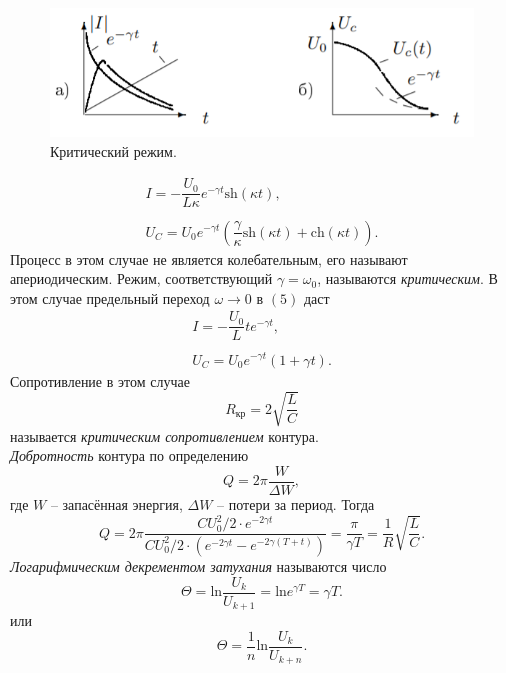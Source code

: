 \documentclass[a4paper,12pt]{report}
\begin{document}
\begin{figure}
\includegraphics[scale=0.7]{4.png}
\caption{Критический режим.}
\vspace{-40pt}
\end{figure}
$$
\begin{array}{c}
I = -\dfrac{U_0}{L\kappa}e^{-\gamma t}\text{sh}(\kappa t),\\
\\
U_C = U_0 e^{-\gamma t}\left( \dfrac{\gamma}{\kappa}\text{sh}(\kappa t) + \text{ch}(\kappa t) \right).
\end{array}
$$
Процесс в этом случае не является колебательным, его называют апериодическим. Режим, соответствующий $\gamma = \omega_0$, называются \textit{критическим}. В этом случае предельный переход $\omega \rightarrow 0$ в $(5)$ даст 
$$
\begin{array}{c}
I = -\dfrac{U_0}{L}te^{-\gamma t},\\
\\
U_C=U_0 e^{-\gamma t}(1+\gamma t).
\end{array}
$$
Сопротивление в этом случае 
\begin{equation}
R_{\text{кр}}= 2 \sqrt{\dfrac{L}{C}}
\end{equation}
называется \textit{критическим сопротивлением} контура.\\
\textit{Добротность} контура по определению 
$$
Q = 2\pi \dfrac{W}{\Delta W},
$$ 
где $W$ -- запасённая энергия, $\Delta W$ -- потери за период. Тогда
\begin{equation}
Q = 2\pi\dfrac{CU_0^2/2 \cdot e^{-2\gamma t}}{CU_0^2/2 \cdot (e^{-2\gamma t} - e^{-2\gamma (T+t)})}=\dfrac{\pi}{\gamma T}=\dfrac{1}{R}\sqrt{\dfrac{L}{C}}.
\end{equation}
\textit{Логарифмическим декрементом затухания} называются число
\begin{equation}
\Theta = \text{ln}\dfrac{U_k}{U_{k+1}}=\text{ln} e^{\gamma T}=\gamma T.
\end{equation}
или 
\begin{equation}
\Theta = \dfrac{1}{n} \text{ln}\dfrac{U_k}{U_{k+n}}.
\end{equation}
\end{document}
